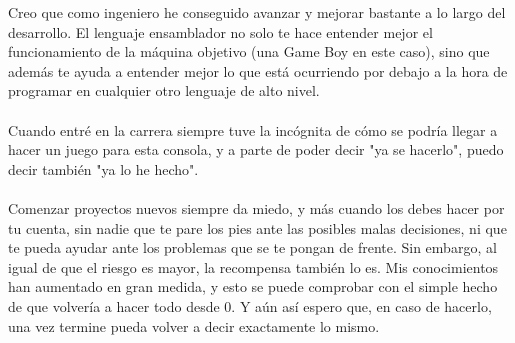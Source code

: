 Creo que como ingeniero he conseguido avanzar y mejorar bastante a lo largo del desarrollo. El lenguaje ensamblador no solo te hace entender mejor el funcionamiento de la máquina objetivo (una Game Boy en este caso), sino que además te ayuda a entender mejor lo que está ocurriendo por debajo a la hora de programar en cualquier otro lenguaje de alto nivel.
\\ \\
Cuando entré en la carrera siempre tuve la incógnita de cómo se podría llegar a hacer un juego para esta consola, y a parte de poder decir "ya se hacerlo", puedo decir también "ya lo he hecho".
\\ \\
Comenzar proyectos nuevos siempre da miedo, y más cuando los debes hacer por tu cuenta, sin nadie que te pare los pies ante las posibles malas decisiones, ni que te pueda ayudar ante los problemas que se te pongan de frente. Sin embargo, al igual de que el riesgo es mayor, la recompensa también lo es. Mis conocimientos han aumentado en gran medida, y esto se puede comprobar con el simple hecho de que volvería a hacer todo desde 0. Y aún así espero que, en caso de hacerlo, una vez termine pueda volver a decir exactamente lo mismo.

